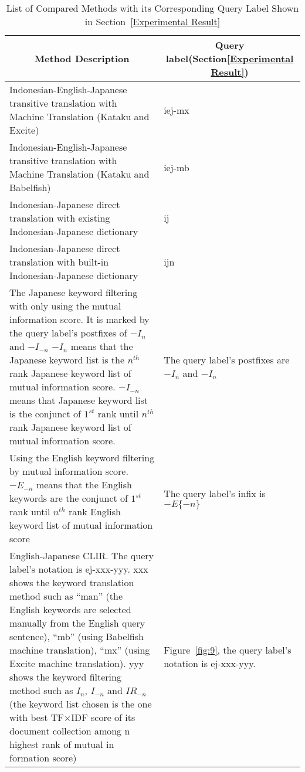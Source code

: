 \documentclass[english]{jnlp_1.3c}
\begin{document}
\begin{table}[t]
  \caption{List of Compared Methods with its Corresponding Query Label
 Shown in Section~\ref{Experimental Result}}
  \label{table:5}
  \begin{center}
   \begin{tabular}{|l|l|}\hline
    \multicolumn{1}{|c|}{Method Description} &
    \multicolumn{1}{|c|}{Query label(Section\ref{Experimental Result})} \\ \hline
    
    \multicolumn{1}{|p{30em}|}{Indonesian-English-Japanese transitive
    translation with Machine Translation (Kataku and Excite)}
    & iej-mx    \\  \hline
    \multicolumn{1}{|p{30em}|}{Indonesian-English-Japanese transitive
    translation with Machine Translation (Kataku and Babelfish)}
    & iej-mb    \\ \hline
    \multicolumn{1}{|p{30em}|}{Indonesian-Japanese direct translation
    with existing Indonesian-Japanese dictionary}
    & ij    \\ \hline
     \multicolumn{1}{|p{30em}|}{Indonesian-Japanese direct translation
    with built-in Indonesian-Japanese dictionary}
    & ijn    \\ \hline
     \multicolumn{1}{|p{30em}|}{The Japanese keyword filtering with only
    using the mutual information score. It is marked by the query
    label's postfixes of $-I_n$ and $-I_{-n}$ $-I_n$ means that the
    Japanese keyword list is the $n^{th}$ rank Japanese keyword list of
    mutual information score. $-I_{-n}$ means that Japanese keyword list
    is the conjunct of $1^{st}$ rank until $n^{th}$ rank Japanese
    keyword list of mutual information score.}
    & \multicolumn{1}{|p{10em}|}{The query label's postfixes are $-I_n$ and
    $-I_n$} \\ \hline
    \multicolumn{1}{|p{30em}|}{Using the English keyword filtering by
    mutual information score. $-E_{-n}$ means that the English keywords
    are the conjunct of $1^{st}$ rank until $n^{th}$ rank English
    keyword list of mutual information score} &
    \multicolumn{1}{|p{10em}|}{The query label's infix is $-E\{-n\}$}
    \\ \hline
    \multicolumn{1}{|p{30em}|}{English-Japanese CLIR. The query label's
    notation is ej-xxx-yyy. xxx shows the keyword translation method such
    as ``man'' (the English keywords are selected manually from the
    English query sentence), ``mb'' (using Babelfish machine
    translation), ``mx'' (using Excite machine translation). yyy shows
    the keyword filtering method such as $I_n$, $I_{-n}$ and $IR_{-n}$
    (the keyword list chosen is the one with best TF×IDF score of its
    document collection among n highest rank of mutual in formation score)} &
    \multicolumn{1}{|p{10em}|}{Figure~\ref{fig:9}, the query label's notation is
   ej-xxx-yyy.} \\ \hline
   \end{tabular}
  \end{center}
\end{table}
\end{document}
